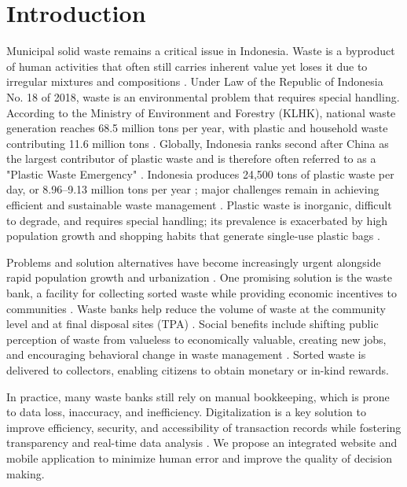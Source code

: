 \documentclass[conference, compsoc, twoside]{IEEEtran}
\begin{document}
\section{Introduction}
Municipal solid waste remains a critical issue in Indonesia. Waste is a byproduct of human activities that often still carries inherent value yet loses it due to irregular mixtures and compositions \cite{Mahyudin2014}. Under Law of the Republic of Indonesia No. 18 of 2018, waste is an environmental problem that requires special handling. According to the Ministry of Environment and Forestry (KLHK), national waste generation reaches 68.5 million tons per year, with plastic and household waste contributing 11.6 million tons \cite{KLHK2022}. Globally, Indonesia ranks second after China as the largest contributor of plastic waste and is therefore often referred to as a "Plastic Waste Emergency" \cite{Putu2020}. Indonesia produces 24,500 tons of plastic waste per day, or 8.96--9.13 million tons per year \cite{AlamsyahFadli2023}; major challenges remain in achieving efficient and sustainable waste management \cite{KLHK2020}. Plastic waste is inorganic, difficult to degrade, and requires special handling; its prevalence is exacerbated by high population growth and shopping habits that generate single-use plastic bags \cite{Kuswardhani2016}.

Problems and solution alternatives have become increasingly urgent alongside rapid population growth and urbanization \cite{Lingga2024}. One promising solution is the waste bank, a facility for collecting sorted waste while providing economic incentives to communities \cite{Ariefahnoor2020}. Waste banks help reduce the volume of waste at the community level and at final disposal sites (TPA) \cite{Suryani2014}. Social benefits include shifting public perception of waste from valueless to economically valuable, creating new jobs, and encouraging behavioral change in waste management \cite{Ramadani2021}. Sorted waste is delivered to collectors, enabling citizens to obtain monetary or in-kind rewards.

In practice, many waste banks still rely on manual bookkeeping, which is prone to data loss, inaccuracy, and inefficiency. Digitalization is a key solution to improve efficiency, security, and accessibility of transaction records while fostering transparency and real-time data analysis \cite{Radiansyah2022}. We propose an integrated website and mobile application to minimize human error and improve the quality of decision making.
\end{document}
